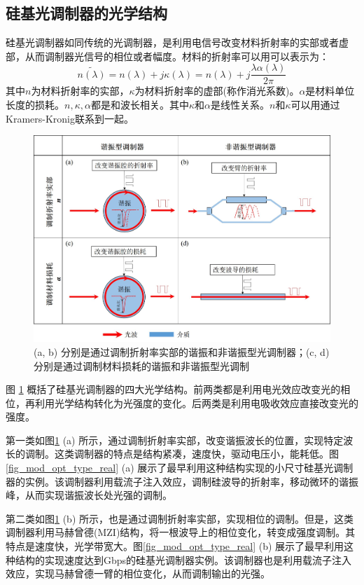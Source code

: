 \subsection{硅基光调制器的光学结构}
硅基光调制器如同传统的光调制器，是利用电信号改变材料折射率的实部或者虚部，从而调制器光信号的相位或者幅度。材料的折射率可以用可以表示为：
\begin{equation}
	\label{Equ:index}
	\widetilde{n(\lambda)} = n(\lambda) + j\kappa(\lambda) =  n(\lambda) + j\frac{\lambda\alpha(\lambda)}{2\pi}
\end{equation}
其中$n$为材料折射率的实部，$\kappa$为材料折射率的虚部(称作消光系数)。$\alpha$是材料单位长度的损耗。$n, \kappa, \alpha$都是和波长相关。其中$\kappa$和$\alpha$是线性关系。$n$和$\kappa$可以用通过Kramers-Kronig联系到一起\cite{o1981kramers}。

\begin{figure}[htb]
	\centering
	\includegraphics[width=12cm]{./Pictures/fig_mod_opt_type.jpg}
	\caption{ (a, b) 分别是通过调制折射率实部的谐振和非谐振型光调制器；(c, d)分别是通过调制材料损耗的谐振和非谐振型光调制}
	\label{fig_mod_opt_type}
\end{figure}
图 \ref{fig_mod_opt_type} 概括了硅基光调制器的四大光学结构。前两类都是利用电光效应改变光的相位，再利用光学结构转化为光强度的变化。后两类是利用电吸收效应直接改变光的强度。

第一类如图\ref{fig_mod_opt_type} (a) 所示，通过调制折射率实部，改变谐振波长的位置，实现特定波长的调制。这类调制器的特点是结构紧凑，速度快，驱动电压小，能耗低。图\ref{fig_mod_opt_type_real} (a) 展示了最早利用这种结构实现的小尺寸硅基光调制器的实例\cite{xu2005micrometre}。该调制器利用载流子注入效应，调制硅波导的折射率，移动微环的谐振峰，从而实现谐振波长处光强的调制。

第二类如图\ref{fig_mod_opt_type} (b) 所示，也是通过调制折射率实部，实现相位的调制。但是，这类调制器利用马赫曾德(MZI)结构，将一根波导上的相位变化，转变成强度调制。其特点是速度快，光学带宽大。图\ref{fig_mod_opt_type_real} (b) 展示了最早利用这种结构的实现速度达到Gbps的硅基光调制器实例\cite{liu2004high}。该调制器也是利用载流子注入效应，实现马赫曾德一臂的相位变化，从而调制输出的光强。

